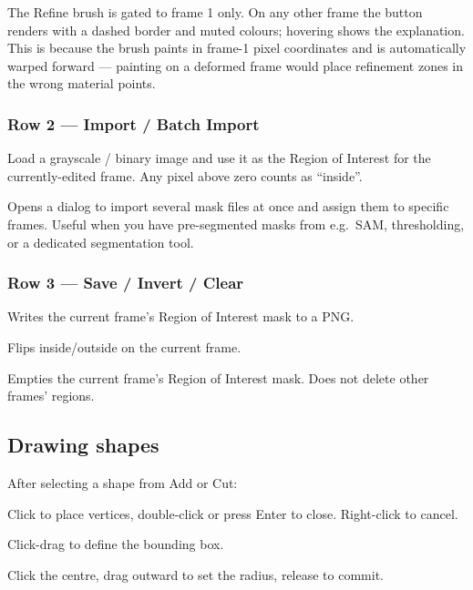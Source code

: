 \begin{warnbox}
The Refine brush is gated to frame 1 only. On any other frame the
button renders with a dashed border and muted colours; hovering shows
the explanation. This is because the brush paints in frame-1 pixel
coordinates and is automatically warped forward --- painting on a
deformed frame would place refinement zones in the wrong material
points.
\end{warnbox}

\subsubsection*{Row 2 --- Import / Batch Import}

\begin{description}[leftmargin=1.2cm,style=nextline]
  \item[Import]
    Load a grayscale / binary image and use it as the Region of
    Interest for the currently-edited frame. Any pixel above zero
    counts as ``inside''.
  \item[Batch Import]
    Opens a dialog to import several mask files at once and assign
    them to specific frames. Useful when you have pre-segmented
    masks from e.g.\ SAM, thresholding, or a dedicated segmentation
    tool.
\end{description}

\subsubsection*{Row 3 --- Save / Invert / Clear}

\begin{description}[leftmargin=1.2cm,style=nextline]
  \item[Save]
    Writes the current frame's Region of Interest mask to a PNG.
  \item[Invert]
    Flips inside/outside on the current frame.
  \item[Clear]
    Empties the current frame's Region of Interest mask. Does not
    delete other frames' regions.
\end{description}

\subsection{Drawing shapes}

After selecting a shape from Add or Cut:

\begin{description}[leftmargin=1.2cm,style=nextline]
  \item[Polygon]
    Click to place vertices, double-click or press Enter to close.
    Right-click to cancel.
  \item[Rectangle]
    Click-drag to define the bounding box.
  \item[Circle]
    Click the centre, drag outward to set the radius, release to
    commit.
\end{description}


